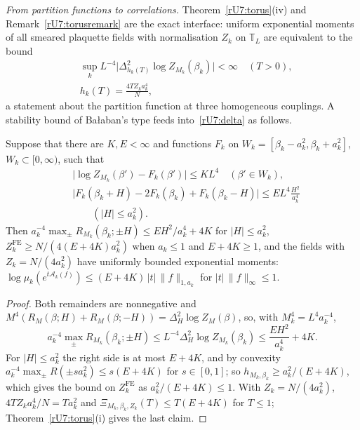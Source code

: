 \emph{From partition functions to correlations.} Theorem~\ref{rU7:torus}(iv)
and Remark~\ref{rU7:torusremark} are the exact interface: uniform exponential
moments of all smeared plaquette fields with normalisation $Z_k$ on
$\mathbb T_L$ are equivalent to the bound
\begin{equation}
\begin{split}
&\sup_kL^{-4}\bigl|\Delta^2_{h_k(T)}\log Z_{M_k}(\beta_k)\bigr|<\infty\quad
(T>0),\\
&h_k(T)=\frac{4TZ_ka_k^4}N ,
\end{split}
\tag{rU7.4}\label{rU7:delta}
\end{equation}
a statement about the partition function at three homogeneous couplings. A
stability bound of Ba{\l}aban's type feeds into~\eqref{rU7:delta} as follows.

\begin{corollary}\label{rU7:B}
Suppose that there are $K,E<\infty$ and functions $F_k$ on
$W_k=[\beta_k-a_k^2,\beta_k+a_k^2]$, $W_k\subset[0,\infty)$, such that
\begin{equation}
\begin{split}
&\bigl|\log Z_{M_k}(\beta')-F_k(\beta')\bigr|\le KL^4\quad(\beta'\in W_k),\\
&\bigl|F_k(\beta_k+H)-2F_k(\beta_k)+F_k(\beta_k-H)\bigr|\le EL^4\frac{H^2}{a_k^4}\\
&\qquad(|H|\le a_k^2).
\end{split}
\tag{B}
\end{equation}
Then $a_k^{-4}\max_\pm R_{M_k}(\beta_k;\pm H)\le EH^2/a_k^4+4K$ for $|H|\le a_k^2$,
$Z^{\mathrm{FE}}_k\ge N/(4(E+4K)a_k^2)$ when $a_k\le1$ and $E+4K\ge1$, and the fields
with $Z_k=N/(4a_k^2)$ have uniformly bounded exponential moments:
$\log\mu_k(e^{t\mathcal A_k(f)})\le(E+4K)\,|t|\,\|f\|_{1,a_k}$ for
$|t|\,\|f\|_\infty\le1$.
\end{corollary}

\begin{proof}
Both remainders are nonnegative and $M^4(R_M(\beta;H)+R_M(\beta;-H))=\Delta^2_H
\log Z_M(\beta)$, so, with $M_k^4=L^4a_k^{-4}$,
\[
a_k^{-4}\max_\pm R_{M_k}(\beta_k;\pm H)\le L^{-4}\Delta^2_H\log Z_{M_k}(\beta_k)
\le\frac{EH^2}{a_k^4}+4K .
\]
For $|H|\le a_k^2$ the right side is at most $E+4K$, and by convexity
$a_k^{-4}\max_\pm R(\pm sa_k^2)\le s(E+4K)$ for $s\in[0,1]$; so $h_{M_k,\beta_k}
\ge a_k^2/(E+4K)$, which gives the bound on $Z^{\mathrm{FE}}_k$ as
$a_k^2/(E+4K)\le1$. With $Z_k=N/(4a_k^2)$, $4TZ_ka_k^4/N=Ta_k^2$ and
$\Xi_{M_k,\beta_k,Z_k}(T)\le T(E+4K)$ for $T\le1$; Theorem~\ref{rU7:torus}(i)
gives the last claim.
\end{proof}

